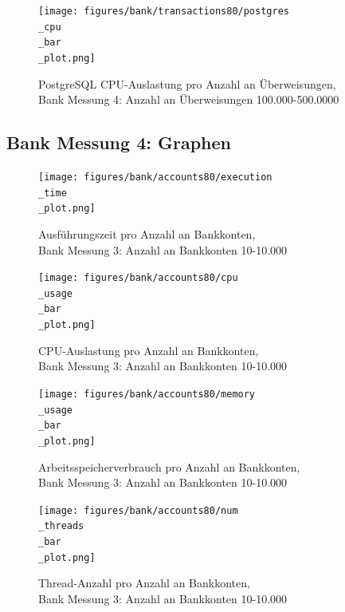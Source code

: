 \documentclass[fontsize=12pt,paper=a4,twoside=semi,parskip=half-,headsepline,headinclude]{scrreprt}
\begin{document}
\begin{figure}[H]
	\centering
	\texttt{[image: figures/bank/transactions80/postgres\\\_cpu\\\_bar\\\_plot.png]}
	\caption{PostgreSQL CPU-Auslastung pro Anzahl an Überweisungen,\\ Bank Messung 4: Anzahl an Überweisungen 100.000-500.0000}
	\label{fig:bankTransactions80PostgCPU}
\end{figure}

\subsection{Bank Messung 4: Graphen}
\label{subsec:bank4graph}

\begin{figure}[H]
	\centering
	\texttt{[image: figures/bank/accounts80/execution\\\_time\\\_plot.png]}
	\caption{Ausführungszeit pro Anzahl an Bankkonten,\\ Bank Messung 3: Anzahl an Bankkonten 10-10.000}
	\label{fig:bankAccounts80Zeit}
\end{figure}

\begin{figure}[H]
	\centering
	\texttt{[image: figures/bank/accounts80/cpu\\\_usage\\\_bar\\\_plot.png]}
	\caption{CPU-Auslastung pro Anzahl an Bankkonten,\\ Bank Messung 3: Anzahl an Bankkonten 10-10.000}
	\label{fig:bankAccounts80CPU}
\end{figure}

\begin{figure}[H]
	\centering
	\texttt{[image: figures/bank/accounts80/memory\\\_usage\\\_bar\\\_plot.png]}
	\caption{Arbeitsspeicherverbrauch pro Anzahl an Bankkonten,\\ Bank Messung 3: Anzahl an Bankkonten 10-10.000}
	\label{fig:bankAccounts80RAM}
\end{figure}

\begin{figure}[H]
	\centering
	\texttt{[image: figures/bank/accounts80/num\\\_threads\\\_bar\\\_plot.png]}
	\caption{Thread-Anzahl pro Anzahl an Bankkonten,\\ Bank Messung 3: Anzahl an Bankkonten 10-10.000}
	\label{fig:bankAccounts80Threads}
\end{figure}
\end{document}
